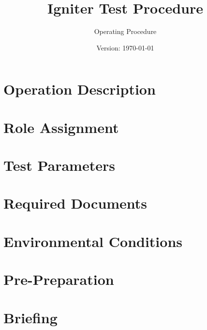 \documentclass{article}
\title{Igniter Test Procedure}
\author{Operating Procedure}
\date{Version: \isodate\today}
\begin{document}
\maketitle

\thispagestyle{fancy}

\renewcommand{\thesection}{\Alph{section}}

\newtoggle{firing}
\toggletrue{firing}

\section{Operation Description}


\section{Role Assignment}


\section{Test Parameters}


\section{Required Documents}


\section{Environmental Conditions}


\newpage

\renewcommand{\thesection}{\arabic{section}}

\setcounter{section}{0}

\section{Pre-Preparation}

\newpage
\section{Briefing}

\end{document}
